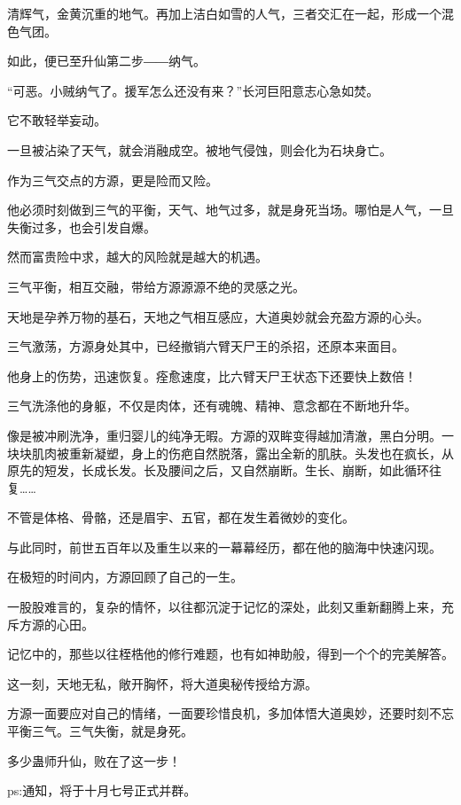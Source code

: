 \begin{this_body}
清辉气，金黄沉重的地气。再加上洁白如雪的人气，三者交汇在一起，形成一个混色气团。

如此，便已至升仙第二步――纳气。

“可恶。小贼纳气了。援军怎么还没有来？”长河巨阳意志心急如焚。

它不敢轻举妄动。

一旦被沾染了天气，就会消融成空。被地气侵蚀，则会化为石块身亡。

作为三气交点的方源，更是险而又险。

他必须时刻做到三气的平衡，天气、地气过多，就是身死当场。哪怕是人气，一旦失衡过多，也会引发自爆。

然而富贵险中求，越大的风险就是越大的机遇。

三气平衡，相互交融，带给方源源源不绝的灵感之光。

天地是孕养万物的基石，天地之气相互感应，大道奥妙就会充盈方源的心头。

三气激荡，方源身处其中，已经撤销六臂天尸王的杀招，还原本来面目。

他身上的伤势，迅速恢复。痊愈速度，比六臂天尸王状态下还要快上数倍！

三气洗涤他的身躯，不仅是肉体，还有魂魄、精神、意念都在不断地升华。

像是被冲刷洗净，重归婴儿的纯净无暇。方源的双眸变得越加清澈，黑白分明。一块块肌肉被重新凝塑，身上的伤疤自然脱落，露出全新的肌肤。头发也在疯长，从原先的短发，长成长发。长及腰间之后，又自然崩断。生长、崩断，如此循环往复……

不管是体格、骨骼，还是眉宇、五官，都在发生着微妙的变化。

与此同时，前世五百年以及重生以来的一幕幕经历，都在他的脑海中快速闪现。

在极短的时间内，方源回顾了自己的一生。

一股股难言的，复杂的情怀，以往都沉淀于记忆的深处，此刻又重新翻腾上来，充斥方源的心田。

记忆中的，那些以往桎梏他的修行难题，也有如神助般，得到一个个的完美解答。

这一刻，天地无私，敞开胸怀，将大道奥秘传授给方源。

方源一面要应对自己的情绪，一面要珍惜良机，多加体悟大道奥妙，还要时刻不忘平衡三气。三气失衡，就是身死。

多少蛊师升仙，败在了这一步！

ps:通知，将于十月七号正式并群。

\end{this_body}

